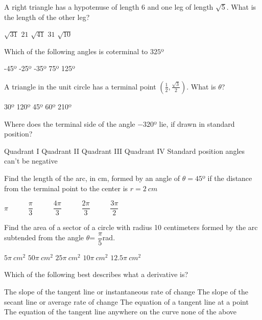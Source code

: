 \documentclass[legalpaper, 12pt, addpoints]{exam}
\begin{document}
\begin{questions}
\question A right triangle has a  hypotenuse of length 6 and one leg of length $\sqrt{5}$. What is the length of the other leg?
  \begin{choices}
      \CorrectChoice $\sqrt{31}$
      \choice $21$
      \choice $\sqrt{41}$
      \choice $31$
      \choice $\sqrt{10}$
\end{choices}

\question Which of the following angles is coterminal to $325$º 
\begin{choices}
  	  \choice -45º
  	  \choice -25º
  	  \CorrectChoice -35º
 	   \choice 75º
  	  \choice 125º
\end{choices}

\question A triangle in the unit circle has a terminal point ${(\frac{1}{2},\frac{\sqrt{3}}{2})}$. What is $\theta$?
\begin{choices}
 	 \choice 30º
 	 \choice 120º
 	 \choice 45º 
  	\CorrectChoice 60º
  	\choice 210º
\end{choices}

\question Where does the terminal side of the angle $-320$º lie, if drawn in standard position?
\begin{choices}
    \CorrectChoice  Quadrant I
    \choice Quadrant II
    \choice Quadrant III
    \choice Quadrant IV
    \choice Standard position angles can't be negative
\end{choices}

\question Find the length of the arc, in cm,  formed by an angle of $\theta = 45$º if the distance from the terminal point to the center is $r=2 \ cm$

\begin{oneparchoices}
    \CorrectChoice  $\pi \qquad \ \ $
    \choice $\dfrac{\pi}{3} \qquad \ \ $
    \choice $\dfrac{4\pi}{3} \qquad \ \ $
    \choice  $\dfrac{2\pi}{3} \qquad \ \ $
    \choice  $\dfrac{3\pi}{2} \qquad \ \ $
\end{oneparchoices}

\question Find the area of a sector of a circle with radius 10 centimeters formed by the arc subtended from the angle \(\theta\)= \(\dfrac{\pi}{5}\)rad.
\begin{choices}
    \choice $5\pi \ cm^2$
    \choice $50\pi \  cm^2$
    \choice $25\pi \ cm^2$
    \CorrectChoice $10\pi \ cm^2$
    \choice $12.5\pi \ cm^2$
\end{choices}
\pagebreak

\question Which of the following best describes what a derivative is?
\begin{choices}
	\CorrectChoice The slope of the tangent line or instantaneous rate of change
	\choice The slope of the secant line or average rate of change
	\choice The equation of a tangent line at a point
	\choice The equation of the tangent line anywhere on the curve
	\choice none of the above
\end{choices}


\end{questions}
\end{document}
